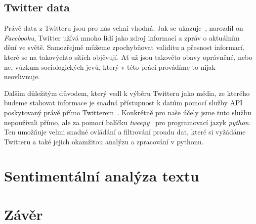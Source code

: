 \documentclass[12pt, a4paper]{article}
\numberwithin{equation}{section} 	%
\begin{document}
\subsection{Twitter data}
\noindent Právě data z Twitteru jsou pro nás velmi vhodná. Jak se ukazuje~\cite{whyNotFb}, narozdíl on \textit{Facebooku}, Twitter užívá mnoho lidí jako zdroj informací a zpráv o aktuálním dění ve světě. Samozřejmě můžeme zpochybňovat validitu a přesnost informací, které se na takovýchto sítích objěvují. Ať už jsou takovéto obavy oprávněné, nebo ne, vůzkum sociologických jevů, který v této práci provádíme to nijak neovlivnuje.

Dalším důležitým důvodem, který vedl k výběru Twitteru jako média, ze kterého budeme stahovat informace je snadná přístupnost k datům pomocí služby API poskytovaný právě přímo Twitterem~\cite{twitterAPI}. Konkrétně pro naše účely jsme tuto službu nepoužívali přímo, ale za pomocí balíčku \textit{tweepy}~\cite{tweepy} pro programovací jazyk \textit{python}. Ten umožňuje velmi snadné ovládání a filtrování proudu dat, které si vyžádáme Twitteru a také jejich okamžitou analýzu a zpracování v pythonu.

\section{Sentimentální analýza textu}
\noindent


\newpage
\section{Závěr}
\noindent
\end{document}
